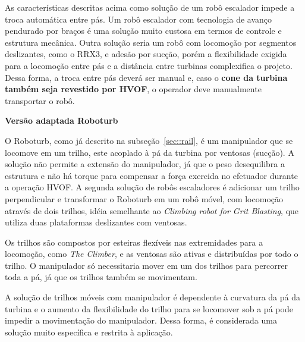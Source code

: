 As características descritas acima como solução de um robô escalador impede a
troca automática entre pás. Um robô escalador com tecnologia de avanço pendurado
por braços é uma solução muito custosa em termos de controle e estrutura
mecânica. Outra solução seria um robô com locomoção por segmentos deslizantes,
como o RRX3, e adesão por sucção, porém a flexibilidade exigida para a locomoção
entre pás e a distância entre turbinas complexifica o projeto. Dessa forma, a
troca entre pás deverá ser manual e, caso o \textbf{cone da turbina também seja
revestido por HVOF}, o operador deve manualmente transportar o robô.

\textbf{Versão adaptada Roboturb}

O Roboturb, como já descrito na subseção~\ref{sec::rail}, é um
manipulador que se locomove em um trilho, este acoplado à pá da turbina
por ventosas (sucção). A solução não permite a extensão
do manipulador, já que o peso desequilibra a estrutura e não há torque para
compensar a força exercida no efetuador durante a operação HVOF. A segunda
solução de robôs escaladores é adicionar um trilho perpendicular e transformar
o Roboturb em um robô móvel, com locomoção através de dois trilhos, idéia
semelhante ao \emph{Climbing robot for Grit Blasting}, que utiliza duas
plataformas deslizantes com ventosas.

Os trilhos são compostos por esteiras flexíveis nas extremidades para a
locomoção, como \emph{The Climber}, e as ventosas são ativas e distribuídas por
todo o trilho. O manipulador só necessitaria mover em um dos trilhos para
percorrer toda a pá, já que os trilhos também se movimentam. 

A solução de trilhos móveis com manipulador é dependente à curvatura da pá da
turbina e o aumento da flexibilidade do trilho para se locomover sob a pá pode
impedir a movimentação do manipulador. Dessa forma, é considerada uma solução
muito específica e restrita à aplicação.